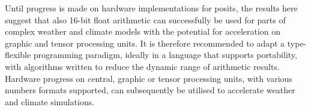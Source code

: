 Until progress is made on hardware implementations for posits, the results here
suggest that also 16-bit float arithmetic can successfully be used for parts of
complex weather and climate models with the potential for acceleration on graphic
and tensor processing units. It is therefore recommended to adapt a type-flexible
programming paradigm, ideally in a language that supports portability, with
algorithms written to reduce the dynamic range of arithmetic results. Hardware
progress on central, graphic or tensor processing units, with various numbers
formats supported, can subsequently be utilised to accelerate weather and
climate simulations.
